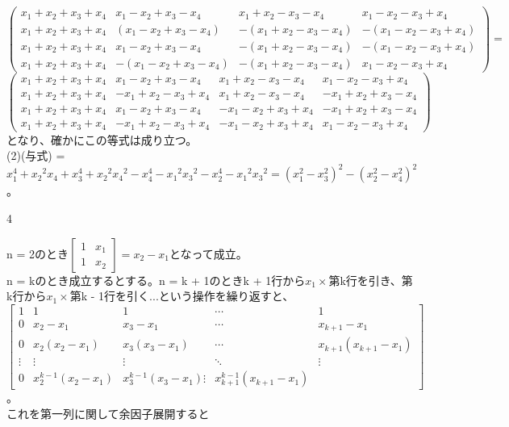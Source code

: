 \documentclass[11pt]{jsarticle}
\begin{document}
$\left(
\begin{array}{cccc}
    x_1+x_2+x_3+x_4 & x_1-x_2+x_3-x_4 & x_1+x_2-x_3-x_4 & x_1-x_2-x_3+x_4 \\
    x_1+x_2+x_3+x_4 & (x_1-x_2+x_3-x_4) & -(x_1+x_2-x_3-x_4) & -(x_1-x_2-x_3+x_4) \\
    x_1+x_2+x_3+x_4 & x_1-x_2+x_3-x_4 & -(x_1+x_2-x_3-x_4) & -(x_1-x_2-x_3+x_4) \\
    x_1+x_2+x_3+x_4 & -(x_1-x_2+x_3-x_4) & -(x_1+x_2-x_3-x_4) & x_1-x_2-x_3+x_4
\end{array}
\right) = $
    $\left(
\begin{array}{cccc}
    x_1+x_2+x_3+x_4 & x_1-x_2+x_3-x_4 & x_1+x_2-x_3-x_ 4 & x_1-x_2-x_3+x_4 \\
    x_1+x_2+x_3+x_4 & -x_1+x_2-x_3+x_4 & x_1+x_2-x_3-x_4 & -x_1+x_2+x_3-x_4 \\
    x_1+x_2+x_3+x_4 & x_1-x_2+x_3-x_4 & -x_1-x_2+x_3+x_4 & -x_1+x_2+x_3-x_4 \\
    x_1+x_2+x_3+x_4 & -x_1+x_2-x_3+x_4 & -x_1-x_2+x_3+x_4 & x_1-x_2-x_3+x_4
\end{array}
\right)$となり、確かにこの等式は成り立つ。\\
(2)(与式) = $x_1^4+{x_2}^2{x_4}+x_3^4+{x_2}^2{x_4}^2 -x_4^4 -{x_1}^2{x_3}^2-x_2^4-{x_1}^2{x_3}^2 = (x_1^2 - x_3^2)^2-(x_2^2 - x_4^2)^2$。\\
\par 4
\par n = 2のとき$
\left[
\begin{array}{cc}
    1 & x_1 \\
    1 & x_2
\end{array}
\right] = x_2 - x_1$となって成立。\\
n = kのとき成立するとする。n = k + 1のときk + 1行から$x_1 \times$第k行を引き、第k行から$x_1 \times$第k - 1行を引く$...$という操作を繰り返すと、\\
    $\left[
    \begin{array}{ccccc}
        1 & 1 & 1 & \cdots & 1 \\
        0 & x_2-x_1 & x_3-x_1 & \cdots & x_{k+1}-x_1 \\
        0 & x_2(x_2-x_1) & x_3(x_3-x_1) & \cdots & x_{k+1}(x_{k+1}-x_1) \\
        \vdots & \vdots & \vdots & \ddots & \vdots \\
        0 & x_2^{k-1}(x_2-x_1) &x_3^{k-1}(x_3-x_1) \vdots & x_{k+1}^{k-1}(x_{k+1}-x_1)
    \end{array}
    \right]
    $。\\これを第一列に関して余因子展開すると
\end{document}

